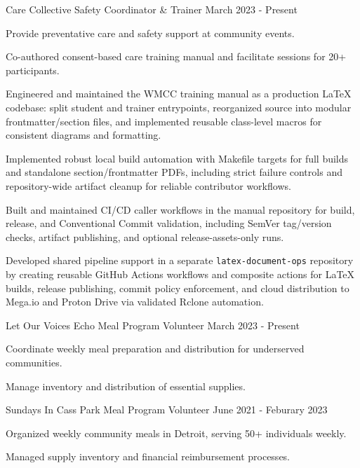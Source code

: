 \documentclass{../styles/cv}
\begin{document}
\subsectionpositiondate
    {Care Collective}
    {Safety Coordinator \& Trainer}
    {March 2023 - Present}
\resumesublistbegin
    \item Provide preventative care and safety support at community events.
    \item Co-authored consent-based care training manual and facilitate sessions for 20+ participants.
    \item Engineered and maintained the WMCC training manual as a production LaTeX codebase: split student and trainer entrypoints, reorganized source into modular frontmatter/section files, and implemented reusable class-level macros for consistent diagrams and formatting.
    \item Implemented robust local build automation with Makefile targets for full builds and standalone section/frontmatter PDFs, including strict failure controls and repository-wide artifact cleanup for reliable contributor workflows.
    \item Built and maintained CI/CD caller workflows in the manual repository for build, release, and Conventional Commit validation, including SemVer tag/version checks, artifact publishing, and optional release-assets-only runs.
    \item Developed shared pipeline support in a separate \texttt{latex-document-ops} repository by creating reusable GitHub Actions workflows and composite actions for LaTeX builds, release publishing, commit policy enforcement, and cloud distribution to Mega.io and Proton Drive via validated Rclone automation.
\resumesublistend

\subsectionpositiondate
    {Let Our Voices Echo}
    {Meal Program Volunteer}
    {March 2023 - Present}
\resumesublistbegin
    \item Coordinate weekly meal preparation and distribution for underserved communities.
    \item Manage inventory and distribution of essential supplies.
\resumesublistend

\subsectionpositiondate
    {Sundays In Cass Park}
    {Meal Program Volunteer}
    {June 2021 - Feburary 2023}
\resumesublistbegin
    \item Organized weekly community meals in Detroit, serving 50+ individuals weekly.
    \item Managed supply inventory and financial reimbursement processes.
\resumesublistend
\end{document}
